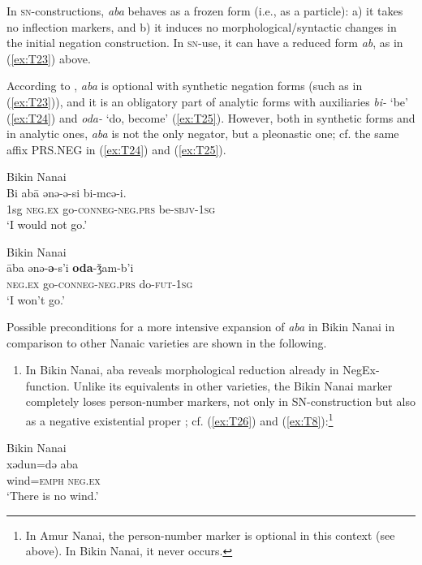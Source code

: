 \documentclass[output=paper]{langscibook}
\begin{document}
In \textsc{sn}-constructions, \textit{aba} behaves as a frozen form (i.e., as a particle): a) it takes no inflection markers, and b) it induces no morphological/syntactic changes in the initial negation construction. In \textsc{sn}-use, it can have a reduced form \textit{ab}, as in (\ref{ex:T23}) above.

According to \citet{Sem1976}, \textit{aba} is optional with synthetic negation forms (such as in (\ref{ex:T23})), and it is an obligatory part of analytic forms with auxiliaries \textit{bi-} ‘be’ (\ref{ex:T24}) and \textit{oda-} ‘do, become’ (\ref{ex:T25}). However, both in synthetic forms and in analytic ones, \textit{aba} is not the only negator, but a pleonastic one; cf. the same affix PRS.NEG in (\ref{ex:T24}) and (\ref{ex:T25}).

\ea Bikin Nanai \label{ex:T24}\\
	\gll Bi	abā	ənə-ə-si					bi-mcə-i.\\
	1sg	\textsc{neg.ex}	go-\textsc{conneg-neg.prs}		be-\textsc{sbjv-1sg}\\
	\glt `I would not go.' \citep[76]{sem1976a}
\z

\ea Bikin Nanai \label{ex:T25}\\
	\gll āba	ənə-\textbf{ə}-s’i			\textbf{oda}-ǯam-b’i\\
	\textsc{neg.ex}	go-\textsc{conneg-neg.prs}	do-\textsc{fut-1sg}\\
	\glt `I won’t go.' \citep[76]{sem1976a}
\z

Possible preconditions for a more intensive expansion of \textit{aba} in Bikin Nanai in comparison to other Nanaic varieties are shown in the following.

\begin{enumerate}
    \item In Bikin Nanai, aba reveals morphological reduction already in NegEx-function. Unlike its equivalents in other varieties, the Bikin Nanai marker completely loses person-number markers, not only in SN-construction but also as a negative existential proper \citep[51]{sem1976a}; cf. (\ref{ex:T26}) and (\ref{ex:T8}):\footnote{In Amur Nanai, the person-number marker is optional in this context (see above). In Bikin Nanai, it never occurs.}
\end{enumerate}

\ea Bikin Nanai \label{ex:T26}\\
	\gll xədun=də	aba\\
	wind=\textsc{emph}	\textsc{neg.ex}\\
	\glt `There is no wind.' \citep[51]{sem1976a}
\z
\end{document}
